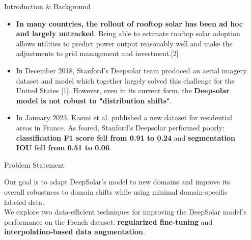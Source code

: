 \documentclass[final]{beamer}
\newlength{\sepwidth}
\newlength{\colwidth}
\newcommand{\separatorcolumn}{\begin{column}{\sepwidth}\end{column}}
\begin{document}
\begin{frame}[t]
\vfill

\begin{columns}[t]
\separatorcolumn

\begin{column}{\colwidth}

\begin{block}{\large Introduction \& Background}
\begin{itemize}
    \item \textbf{In many countries, the rollout of rooftop solar has been ad hoc and largely untracked}. Being able to estimate rooftop solar adoption allows utilities to predict power output reasonably well and make the adjustments to grid management and investment.[2] \\[20pt]
    
    \item In December 2018, Stanford's Deepsolar team produced an aerial imagery dataset and model which together largely solved this challenge for the United States [1]. However, even in its current form, the \textbf{Deepsolar model is not robust to "distribution shifts"}. \\[20pt]
    
    \item In January 2023, Kasmi et al. published a new dataset for residential areas in France. As feared, Stanford's Deepsolar performed poorly: \textbf{classification F1 score fell from 0.91 to 0.24} and \textbf{segmentation IOU fell from 0.51 to 0.06}.

\end{itemize}

\end{block}

\begin{block}{\large Problem Statement}

Our goal is to adapt DeepSolar's model to new domains and improve its overall robustness to domain shifts while using minimal domain-specific labeled data. \\[20pt]

We explore two data-efficient techniques for improving the DeepSolar model's performance on the French dataset: \textbf{regularized fine-tuning} and \textbf{interpolation-based data augmentation}. 

\end{block}


\end{column}
\end{columns}
\end{frame}
\end{document}
